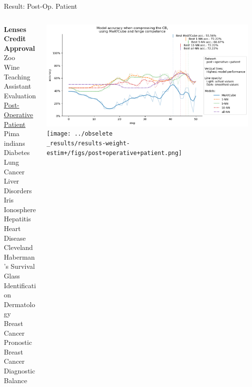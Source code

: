 \documentclass[]{beamer}
\begin{document}
\begin{frame}{Result: Post-Op. Patient}
    \begin{columns}
        \begin{column}{.3\textwidth}
            {\smaller\smaller\smaller
            \textbf{Lenses} \\
            \textbf{Credit Approval} \\
            Zoo \\
            Wine \\
            Teaching Assistant Evaluation \\
            \underline{Post-Operative Patient} \\
            Pima indians Diabetes \\
            Lung Cancer \\
            Liver Disorders \\
            Iris \\
            Ionosphere \\
            Hepatitis \\
            Heart Disease Cleveland \\
            Haberman's Survival \\
            Glass Identification \\
            Dermatology \\
            Breast Cancer Pronostic \\
            Breast Cancer Diagnostic \\
            Balance\\
            ~}
        \end{column}
        \begin{column}{.7\textwidth}
            \includegraphics[width=\textwidth]{../results-no-sim-tuning+/figs/post+operative+patient.png}
            \texttt{[image: ../obselete\\\_results/results-weight-estim+/figs/post+operative+patient.png]}
        \end{column}
    \end{columns}
\end{frame}
\end{document}
